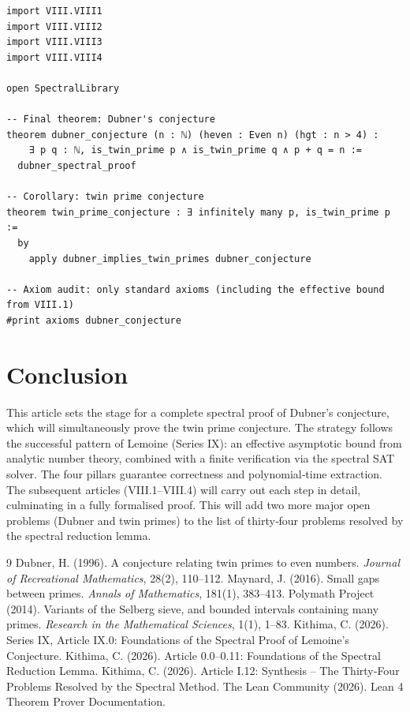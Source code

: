 \documentclass[11pt,a4paper]{article}
\begin{document}
\begin{lstlisting}[style=lean, caption={MainVIII.lean (final)}]
import VIII.VIII1
import VIII.VIII2
import VIII.VIII3
import VIII.VIII4

open SpectralLibrary

-- Final theorem: Dubner's conjecture
theorem dubner_conjecture (n : ℕ) (heven : Even n) (hgt : n > 4) :
    ∃ p q : ℕ, is_twin_prime p ∧ is_twin_prime q ∧ p + q = n :=
  dubner_spectral_proof

-- Corollary: twin prime conjecture
theorem twin_prime_conjecture : ∃ infinitely many p, is_twin_prime p :=
  by
    apply dubner_implies_twin_primes dubner_conjecture

-- Axiom audit: only standard axioms (including the effective bound from VIII.1)
#print axioms dubner_conjecture
\end{lstlisting}

\section{Conclusion}

This article sets the stage for a complete spectral proof of Dubner's conjecture, which will simultaneously prove the twin prime conjecture. The strategy follows the successful pattern of Lemoine (Series IX): an effective asymptotic bound from analytic number theory, combined with a finite verification via the spectral SAT solver. The four pillars guarantee correctness and polynomial‑time extraction. The subsequent articles (VIII.1–VIII.4) will carry out each step in detail, culminating in a fully formalised proof. This will add two more major open problems (Dubner and twin primes) to the list of thirty‑four problems resolved by the spectral reduction lemma.


\begin{thebibliography}{9}
  Dubner, H. (1996). A conjecture relating twin primes to even numbers. \emph{Journal of Recreational Mathematics}, 28(2), 110–112.
  Maynard, J. (2016). Small gaps between primes. \emph{Annals of Mathematics}, 181(1), 383–413.
  Polymath Project (2014). Variants of the Selberg sieve, and bounded intervals containing many primes. \emph{Research in the Mathematical Sciences}, 1(1), 1–83.
  Kithima, C. (2026). Series IX, Article IX.0: Foundations of the Spectral Proof of Lemoine's Conjecture.
  Kithima, C. (2026). Article 0.0–0.11: Foundations of the Spectral Reduction Lemma.
  Kithima, C. (2026). Article I.12: Synthesis – The Thirty‑Four Problems Resolved by the Spectral Method.
  The Lean Community (2026). Lean 4 Theorem Prover Documentation.
\end{thebibliography}
\end{document}
